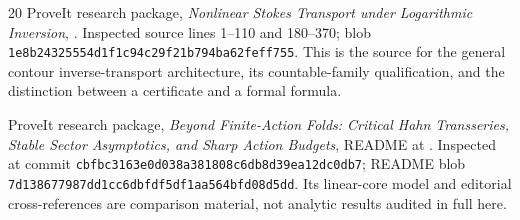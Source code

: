 \documentclass[11pt,a4paper]{article}
\theoremstyle{definition}\newtheorem{definition}[theorem]{Definition}
\theoremstyle{remark}\newtheorem{remark}[theorem]{Remark}
\numberwithin{equation}{section}
\begin{document}
\begin{thebibliography}{20}
ProveIt research package,
\emph{Nonlinear Stokes Transport under Logarithmic Inversion},
.
Inspected source lines 1--110 and 180--370; blob
\texttt{1e8b24325554d1f1c94c29f21b794ba62feff755}.
This is the source for the general contour inverse-transport architecture,
its countable-family qualification, and the distinction between a
certificate and a formal formula.

ProveIt research package,
\emph{Beyond Finite-Action Folds: Critical Hahn Transseries, Stable Sector
Asymptotics, and Sharp Action Budgets}, README at
.
Inspected at commit
\texttt{cbfbc3163e0d038a381808c6db8d39ea12dc0db7}; README blob
\texttt{7d138677987dd1cc6dbfdf5df1aa564bfd08d5dd}.
Its linear-core model and editorial cross-references are comparison
material, not analytic results audited in full here.
\end{thebibliography}
\endgroup
\end{document}
